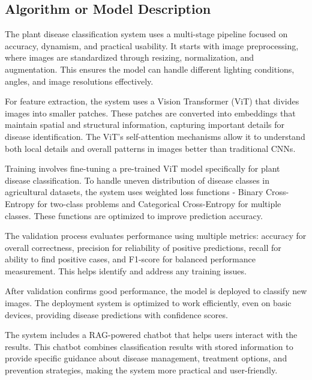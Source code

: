 \subsection{Algorithm or Model Description}





The plant disease classification system uses a multi-stage pipeline focused on accuracy, dynamism, and practical usability. It starts with image preprocessing, where images are standardized through resizing, normalization, and augmentation. This ensures the model can handle different lighting conditions, angles, and image resolutions effectively.

For feature extraction, the system uses a Vision Transformer (ViT) that divides images into smaller patches. These patches are converted into embeddings that maintain spatial and structural information, capturing important details for disease identification. The ViT's self-attention mechanisms allow it to understand both local details and overall patterns in images better than traditional CNNs.

Training involves fine-tuning a pre-trained ViT model specifically for plant disease classification. To handle uneven distribution of disease classes in agricultural datasets, the system uses weighted loss functions - Binary Cross-Entropy for two-class problems and Categorical Cross-Entropy for multiple classes. These functions are optimized to improve prediction accuracy.

The validation process evaluates performance using multiple metrics: accuracy for overall correctness, precision for reliability of positive predictions, recall for ability to find positive cases, and F1-score for balanced performance measurement. This helps identify and address any training issues.

After validation confirms good performance, the model is deployed to classify new images. The deployment system is optimized to work efficiently, even on basic devices, providing disease predictions with confidence scores.

The system includes a RAG-powered chatbot that helps users interact with the results. This chatbot combines classification results with stored information to provide specific guidance about disease management, treatment options, and prevention strategies, making the system more practical and user-friendly.

